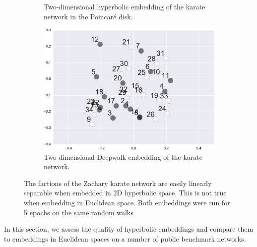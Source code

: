 \documentclass[sigconf, review]{acmart}
\begin{document}
\begin{figure}[t!]
\begin{subfigure}[t]{0.48\textwidth}
        \caption{Two-dimensional hyperbolic embedding of the karate network in the Poincar\'e disk.}
    \end{subfigure}
        \hfill 
    \begin{subfigure}[t]{0.48\textwidth}
        \centering
        \includegraphics[width = \hsize]{deepwalk_karate}
        \caption{Two dimensional Deepwalk embedding of the karate network.}
    \end{subfigure}
    \caption{The factions of the  Zachary karate network are easily linearly separable when embedded in 2D hyperbolic space. This is not true when embedding in Euclidean space. Both embeddings were run for 5 epochs on the same random walks}
    \label{fig:embeddings}
\end{figure}

In this section, we assess the quality of hyperbolic embeddings and compare them to embeddings in Euclidean spaces on a number of public benchmark networks.

\end{document}
